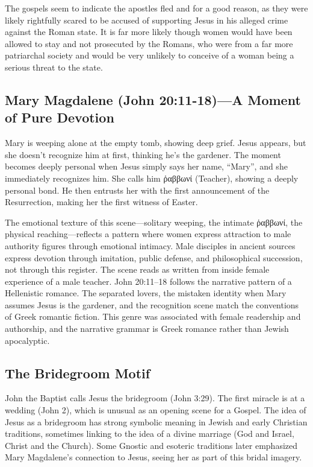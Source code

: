 The gospels seem to indicate the apostles fled and for a good reason, as they were likely rightfully scared to be accused of supporting Jesus in his alleged crime against the Roman state.
It is far more likely though women would have been allowed to stay and not prosecuted by the Romans, who were from a far more patriarchal society and would be very unlikely to conceive of a woman being a serious threat to the state.

\subsection{Mary Magdalene (John 20:11-18)---A Moment of Pure Devotion}\label{subsec:mary-magdalene-john-2011-18-a-moment-of-pure-devotion}

Mary is weeping alone at the empty tomb, showing deep grief.
Jesus appears, but she doesn't recognize him at first, thinking he's the gardener.
The moment becomes deeply personal when Jesus simply says her name, ``Mary'', and she immediately recognizes him.
She calls him ῥαββωνί (Teacher), showing a deeply personal bond.
He then entrusts her with the first announcement of the Resurrection, making her the first witness of Easter.

The emotional texture of this scene---solitary weeping, the intimate ῥαββωνί, the physical reaching---reflects a pattern where women express attraction to male authority figures through emotional intimacy.
Male disciples in ancient sources express devotion through imitation, public defense, and philosophical succession, not through this register.
The scene reads as written from inside female experience of a male teacher.
John 20:11--18 follows the narrative pattern of a Hellenistic romance.
The separated lovers, the mistaken identity when Mary assumes Jesus is the gardener, and the recognition scene match the conventions of Greek romantic fiction.
This genre was associated with female readership and authorship, and the narrative grammar is Greek romance rather than Jewish apocalyptic.

\subsection{The Bridegroom Motif}\label{subsec:the-bridegroom-motif}

John the Baptist calls Jesus the bridegroom (John 3:29).
The first miracle is at a wedding (John 2), which is unusual as an opening scene for a Gospel.
The idea of Jesus as a bridegroom has strong symbolic meaning in Jewish and early Christian traditions, sometimes linking to the idea of a divine marriage (God and Israel, Christ and the Church).
Some Gnostic and esoteric traditions later emphasized Mary Magdalene's connection to Jesus, seeing her as part of this bridal imagery.

